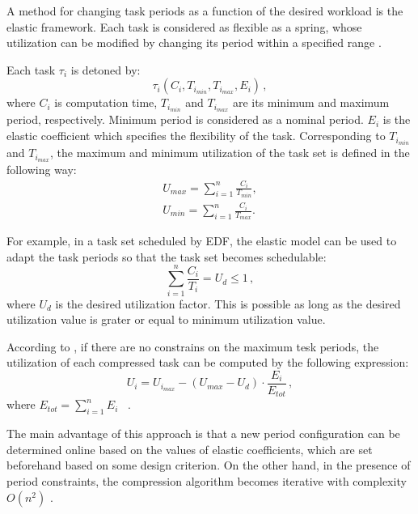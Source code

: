A method for changing task periods as a function of the desired workload is the elastic framework. Each task is considered as flexible as a spring, whose utilization can be modified by changing its period within a specified range 
\cite{lee2007handbook}.

Each task $\tau_i$ is detoned by:
\begin{equation*}
\tau_i(C_i, T_{i_{min}}, T_{i_{max}}, E_i) \, ,
\end{equation*}
where $C_i$ is computation time, $T_{i_{min}}$ and $T_{i_{max}}$ are its minimum and maximum period, respectively.
Minimum period is considered as a nominal period. 
 $E_i$ is the elastic coefficient which specifies the flexibility of the task.
Corresponding to $T_{i_{min}}$ and $T_{i_{max}}$, the maximum and minimum utilization of the task set is defined in the following way:
\begin{align*}
U_{max} = \sum_{i=1}^{n}\frac{C_i}{T_{min}},\\
U_{min} = \sum_{i=1}^{n}\frac{C_i}{T_{max}}.
\end{align*}

For example, in a task set scheduled by EDF, the elastic model can be used to adapt the task periods so that the task set becomes schedulable:
\begin{equation*}
\sum_{i=1}^{n}\frac{C_i}{T_i} = U_d \leq 1 \, ,
\end{equation*}
where $U_d$ is the desired utilization factor.
This is possible as long as the desired utilization value is grater or equal to minimum utilization value.

According to \cite{lee2007handbook}, if there are no constrains on the maximum tesk periods, the utilization of each compressed task can be computed by the following expression:
\begin{equation*}
U_i = U_{i_{max}} - ( U_{max} - U_d ) \cdot \frac{E_i}{E_{tot}} \, ,
\end{equation*}
where \( E_{tot} = \sum_{i=1}^{n}E_i \) \, .

The main advantage of this approach is that a new period configuration can be determined online based on the values of elastic coefficients, which are set beforehand based on some design criterion.
On the other hand, in the presence of period constraints, the compression algorithm becomes iterative with complexity \( O(n^2) \) \cite{lee2007handbook}.

